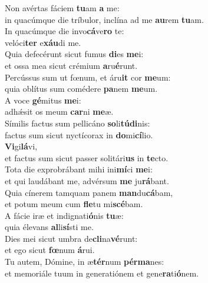 \evenverse Non avértas fáciem \textbf{tu}am \textbf{a} me:~\*\\
\evenverse in quacúmque die tríbulor, inclína ad me \textbf{au}rem \textbf{tu}am.\\
\oddverse In quacúmque die invo\textbf{cá}ve\textbf{ro} te:~\*\\
\oddverse velóci\textbf{ter} e\textbf{xáu}di me.\\
\evenverse Quia defecérunt sicut fumus \textbf{di}es \textbf{me}i:~\*\\
\evenverse et ossa mea sicut crémium \textbf{a}ru\textbf{é}runt.\\
\oddverse Percússus sum ut fœnum, et áru\textbf{it} cor \textbf{me}um:~\*\\
\oddverse quia oblítus sum comédere \textbf{pa}nem \textbf{me}um.\\
\evenverse A voce \textbf{gé}mitus \textbf{me}i:~\*\\
\evenverse adhǽsit os meum \textbf{car}ni \textbf{me}æ.\\
\oddverse Símilis factus sum pellicáno \textbf{so}li\textbf{tú}\textbf{di}nis:~\*\\
\oddverse factus sum sicut nyctícorax in \textbf{do}mi\textbf{cí}lio.\\
\evenverse \textbf{Vi}gi\textbf{lá}vi,~\*\\
\evenverse et factus sum sicut passer solitári\textbf{us} in \textbf{te}cto.\\
\oddverse Tota die exprobrábant mihi ini\textbf{mí}ci \textbf{me}i:~\*\\
\oddverse et qui laudábant me, advérsum \textbf{me} ju\textbf{rá}bant.\\
\evenverse Quia cínerem tamquam panem \textbf{man}du\textbf{cá}bam,~\*\\
\evenverse et potum meum cum \textbf{fle}tu mi\textbf{scé}bam.\\
\oddverse A fácie iræ et indignati\textbf{ó}nis \textbf{tu}æ:~\*\\
\oddverse quia élevans \textbf{al}li\textbf{sí}sti me.\\
\evenverse Dies mei sicut umbra de\textbf{cli}na\textbf{vé}runt:~\*\\
\evenverse et ego sicut \textbf{fœ}num \textbf{á}rui.\\
\oddverse Tu autem, Dómine, in æ\textbf{tér}num \textbf{pér}\textbf{ma}nes:~\*\\
\oddverse et memoriále tuum in generatiónem et gene\textbf{ra}ti\textbf{ó}nem.\\
